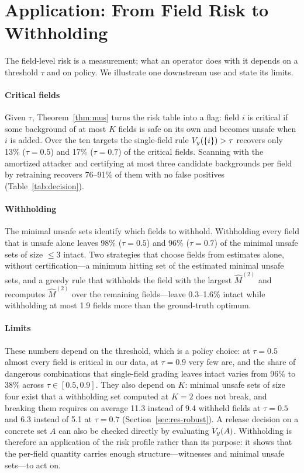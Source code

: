 \section{Application: From Field Risk to Withholding}\label{sec:application}

The field-level risk is a measurement; what an operator does with it depends on a threshold $\tau$
and on policy. We illustrate one downstream use and state its limits.

\paragraph{Critical fields}
Given $\tau$, Theorem~\ref{thm:mus} turns the risk table into a flag: field $i$ is critical if some
background of at most $K$ fields is safe on its own and becomes unsafe when $i$ is added. Over the ten
targets the single-field rule $V_{y}(\{i\})>\tau$ recovers only 13\% ($\tau=0.5$) and 17\% ($\tau=0.7$) of
the critical fields. Scanning with the amortized attacker and certifying at most three candidate
backgrounds per field by retraining recovers 76--91\% of them with no false positives
(Table~\ref{tab:decision}).

\paragraph{Withholding}
The minimal unsafe sets identify which fields to withhold. Withholding every field that is unsafe
alone leaves 98\% ($\tau=0.5$) and 96\% ($\tau=0.7$) of the minimal unsafe sets of size $\le3$ intact.
Two strategies that choose fields from estimates alone, without certification---a minimum hitting set of the estimated
minimal unsafe sets, and a greedy rule that withholds the field with the largest $\hat M^{(2)}$ and
recomputes $\hat M^{(2)}$ over the remaining fields---leave 0.3--1.6\% intact while withholding at most
1.9 fields more than the ground-truth optimum.

\paragraph{Limits}
These numbers depend on the threshold, which is a policy choice: at $\tau=0.5$ almost every field is
critical in our data, at $\tau=0.9$ very few are, and the share of dangerous combinations that
single-field grading leaves intact varies from 96\% to 38\% across $\tau\in[0.5,0.9]$. They also depend
on $K$: minimal unsafe sets of size four exist that a withholding set computed at $K=2$ does not break,
and breaking them requires on average 11.3 instead of 9.4 withheld fields at $\tau=0.5$ and 6.3 instead
of 5.1 at $\tau=0.7$ (Section~\ref{sec:res-robust}). A release decision on a concrete set $A$ can also be checked directly by
evaluating $V_{y}(A)$. Withholding is therefore an application of the risk profile rather than its purpose: it shows that
the per-field quantity carries enough structure---witnesses and minimal unsafe sets---to act on.


